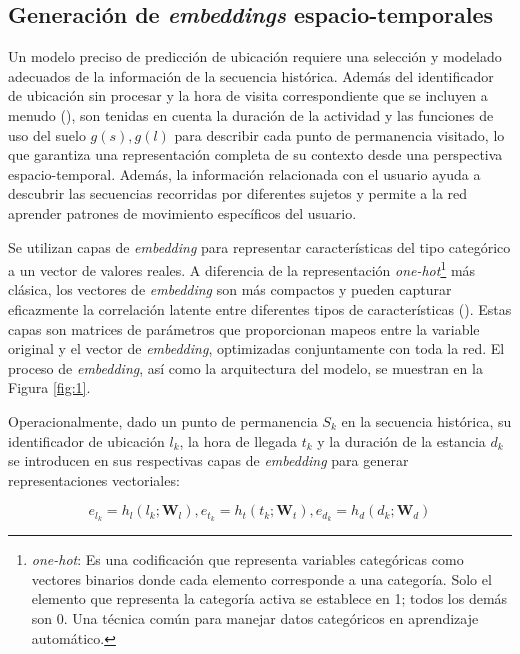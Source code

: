 \subsection{Generación de \textit{embeddings} espacio-temporales}

Un modelo preciso de predicción de ubicación requiere una selección 
y modelado adecuados de la información de la secuencia histórica. 
Además del identificador de ubicación sin procesar y la hora de 
visita correspondiente que se incluyen a menudo (\cite{li2020hierarchical}), 
son tenidas en cuenta la duración de la actividad y las funciones de uso del 
suelo $g(s),g(l)$ para describir cada punto de permanencia visitado, lo que 
garantiza una representación completa de su contexto desde una 
perspectiva espacio-temporal. Además, la información relacionada 
con el usuario ayuda a descubrir las secuencias recorridas por 
diferentes sujetos y permite a la red aprender patrones de 
movimiento específicos del usuario.

Se utilizan capas de \textit{embedding} para representar características 
del tipo categórico a un vector de valores reales. A diferencia de la 
representación \textit{one-hot}\footnote{\textit{one-hot}: Es una codificación que 
representa variables categóricas como vectores binarios donde cada 
elemento corresponde a una categoría. Solo el elemento que 
representa la categoría activa se establece en 1; todos los demás 
son 0. Una técnica común para manejar datos categóricos en 
aprendizaje automático.}
más clásica, los vectores de \textit{embedding} 
son más compactos y pueden capturar eficazmente la correlación 
latente entre diferentes tipos de características (\cite{xu2022understanding}). 
Estas capas son matrices de parámetros que proporcionan mapeos 
entre la variable original y el vector de \textit{embedding}, optimizadas 
conjuntamente con toda la red. El proceso de \textit{embedding}, as\'i
como la arquitectura del modelo, se muestran en la Figura \ref{fig:1}.

Operacionalmente, dado un punto de permanencia \(S_k\) en la 
secuencia histórica, su identificador de ubicación \(l_k\), 
la hora de llegada \(t_k\) y la duración de la estancia \(d_k\) 
se introducen en sus respectivas capas de \textit{embedding} para 
generar representaciones vectoriales:

\begin{equation}
    e_{l_k} = h_l(l_k; \mathbf{W}_l), 
    e_{t_k} = h_t(t_k; \mathbf{W}_t), 
    e_{d_k} = h_d(d_k; \mathbf{W}_d) \tag{1}
    \label{eq:1}
\end{equation}

